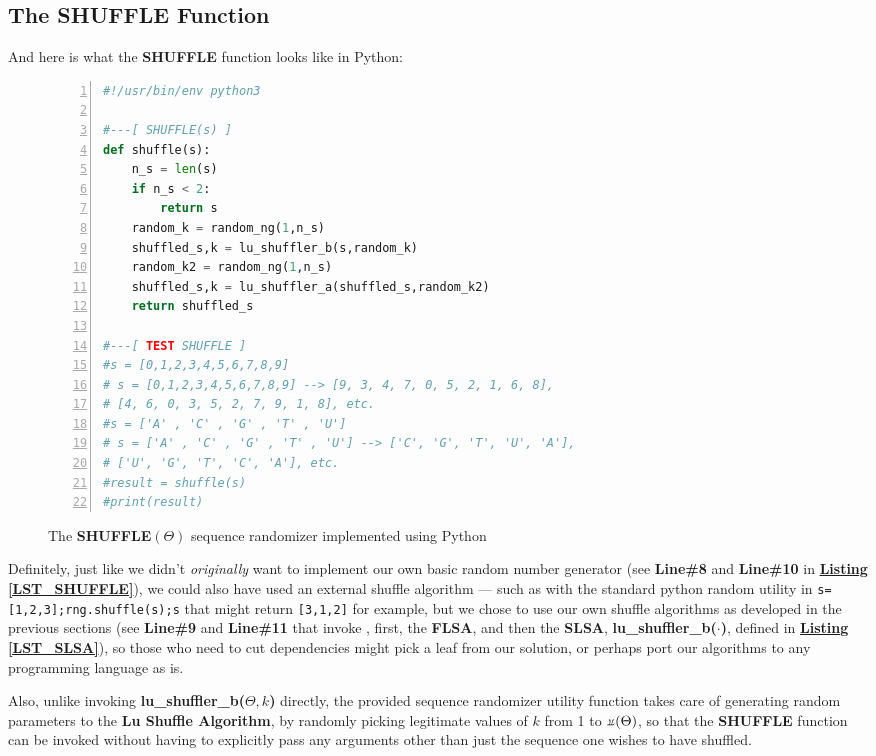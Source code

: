 \documentclass[a4paper, 18pt]{book} %
\newcommand{\invpi}{\rotatebox[origin=c]{180}{$\pi$}}
\begin{document}
\subsection{The SHUFFLE Function}

And here is what the \textbf{SHUFFLE} function looks like in Python:

\begin{figure}[H]
  \begin{center}
  \begin{lstlisting}[caption={The SHUFFLE}, label={LST_SHUFFLE}, language=Python, frame=single, numbers=left, basicstyle=\ttfamily,  commentstyle=\color{blue}]
#!/usr/bin/env python3

#---[ SHUFFLE(s) ]
def shuffle(s):
    n_s = len(s)
    if n_s < 2:
        return s
    random_k = random_ng(1,n_s)
    shuffled_s,k = lu_shuffler_b(s,random_k)
    random_k2 = random_ng(1,n_s)
    shuffled_s,k = lu_shuffler_a(shuffled_s,random_k2)
    return shuffled_s

#---[ TEST SHUFFLE ]
#s = [0,1,2,3,4,5,6,7,8,9]
# s = [0,1,2,3,4,5,6,7,8,9] --> [9, 3, 4, 7, 0, 5, 2, 1, 6, 8], 
# [4, 6, 0, 3, 5, 2, 7, 9, 1, 8], etc.
#s = ['A' , 'C' , 'G' , 'T' , 'U']
# s = ['A' , 'C' , 'G' , 'T' , 'U'] --> ['C', 'G', 'T', 'U', 'A'], 
# ['U', 'G', 'T', 'C', 'A'], etc.
#result = shuffle(s)
#print(result)
\end{lstlisting}
  \end{center}
  \caption{The \textbf{SHUFFLE}$(\Theta)$ sequence randomizer implemented using Python}
\end{figure}

Definitely, just like we didn't \textit{originally} want to implement our own basic random number generator (see \textbf{Line\#8} and \textbf{Line\#10} in \textbf{\hyperref[LST_SHUFFLE]{Listing \ref{LST_SHUFFLE}}}), we could also have used an external shuffle algorithm --- such as with the standard python random utility in \texttt{s=[1,2,3];rng.shuffle(s);s} that might return \texttt{[3,1,2]} for example, but we chose to use our own shuffle algorithms as developed in the previous sections (see \textbf{Line\#9} and \textbf{Line\#11} that invoke , first, the \textbf{FLSA}, and then the \textbf{SLSA}, \textbf{lu\_shuffler\_b($\cdot$)}, defined in \textbf{\hyperref[LST_SLSA]{Listing \ref{LST_SLSA}}}), so those who need to cut dependencies might pick a leaf from our solution, or perhaps port our algorithms to any programming language as is. 

Also, unlike invoking  \textbf{lu\_shuffler\_b($\Theta, k$)} directly, the provided sequence randomizer utility function takes care of generating random parameters to the \textbf{Lu Shuffle Algorithm}, by randomly picking legitimate values of $k$ from 1 to $\invpi(\Theta)$, so that the \textbf{SHUFFLE} function can be invoked without having to explicitly pass any arguments other than just the sequence one wishes to have shuffled.
\end{document}
